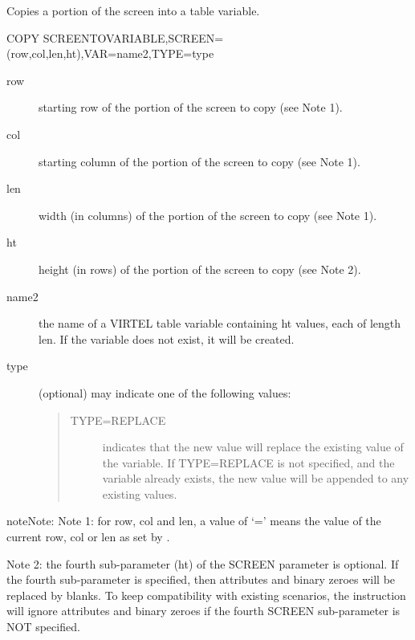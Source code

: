 \documentclass[letterpaper,10pt,english]{sphinxmanual}
\begin{document}

Copies a portion of the screen into a table variable.

\begin{sphinxVerbatim}[commandchars=\\\{\}]
COPY\PYGZdl{} SCREEN\PYGZhy{}TO\PYGZhy{}VARIABLE,SCREEN=(row,col,len,ht),VAR=\PYGZsq{}name2\PYGZsq{},TYPE=type
\end{sphinxVerbatim}
\begin{description}
\item[{row}] \leavevmode
starting row of the portion of the screen to copy (see Note 1).

\item[{col}] \leavevmode
starting column of the portion of the screen to copy (see Note 1).

\item[{len}] \leavevmode
width (in columns) of the portion of the screen to copy (see Note 1).

\item[{ht}] \leavevmode
height (in rows) of the portion of the screen to copy (see Note 2).

\item[{name2}] \leavevmode
the name of a VIRTEL table variable containing ht values, each of length len. If the variable does not exist, it will be created.

\item[{type}] \leavevmode
(optional) may indicate one of the following values:
\begin{quote}
\begin{description}
\item[{TYPE=REPLACE}] \leavevmode
indicates that the new value will replace the existing value of the variable. If TYPE=REPLACE is not specified, and the variable already exists, the new value will be appended to any existing values.

\end{description}
\end{quote}

\end{description}

\begin{sphinxadmonition}{note}{Note:}
Note 1: for row, col and len, a value of ‘=’ means the value of the current row, col or len as set by {\hyperref[\detokenize{User_Guide:v457ug-set-screen-position}]{}}.

Note 2: the fourth sub-parameter (ht) of the SCREEN parameter is optional. If the fourth sub-parameter is specified, then attributes and binary zeroes will be replaced by blanks. To keep compatibility with existing scenarios, the instruction will ignore attributes and binary zeroes if the fourth SCREEN sub-parameter is NOT specified.
\end{sphinxadmonition}
\end{document}

